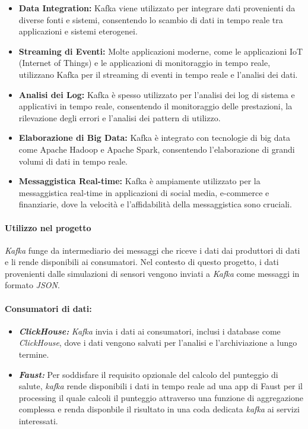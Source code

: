 \begin{itemize}
  \item \textbf{Data Integration:} Kafka viene utilizzato per integrare dati provenienti da diverse fonti e sistemi, consentendo lo scambio di dati in tempo reale tra applicazioni e sistemi eterogenei.
  
  \item \textbf{Streaming di Eventi:} Molte applicazioni moderne, come le applicazioni IoT (Internet of Things) e le applicazioni di monitoraggio in tempo reale, utilizzano Kafka per il streaming di eventi in tempo reale e l'analisi dei dati.
  
  \item \textbf{Analisi dei Log:} Kafka è spesso utilizzato per l'analisi dei log di sistema e applicativi in tempo reale, consentendo il monitoraggio delle prestazioni, la rilevazione degli errori e l'analisi dei pattern di utilizzo.
  
  \item \textbf{Elaborazione di Big Data:} Kafka è integrato con tecnologie di big data come Apache Hadoop e Apache Spark, consentendo l'elaborazione di grandi volumi di dati in tempo reale.
  
  \item \textbf{Messaggistica Real-time:} Kafka è ampiamente utilizzato per la messaggistica real-time in applicazioni di social media, e-commerce e finanziarie, dove la velocità e l'affidabilità della messaggistica sono cruciali.
\end{itemize}

\paragraph{Utilizzo nel progetto}
\textit{Kafka} funge da intermediario dei messaggi che riceve i dati dai produttori di dati e li rende disponibili ai consumatori. Nel contesto di questo progetto, i dati provenienti dalle simulazioni di sensori vengono inviati a \textit{Kafka} come messaggi in formato \textit{JSON}.

\paragraph*{Consumatori di dati:}
\begin{itemize}
  \item \textbf{\textit{ClickHouse:}} \textit{Kafka} invia i dati ai consumatori, inclusi i database come \textit{ClickHouse}, dove i dati vengono salvati per l'analisi e l'archiviazione a lungo termine.
  \item \textbf{\textit{Faust:}} Per soddisfare il requisito opzionale del calcolo del punteggio di salute, \textit{kafka} rende disponibili i dati in tempo reale ad una app di Faust per il processing il quale calcoli il punteggio attraverso una funzione di aggregazione complessa e renda  disponbile il risultato in una coda dedicata \textit{kafka} ai servizi interessati.
\end{itemize}

